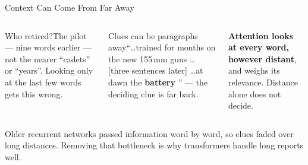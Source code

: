 \documentclass[aspectratio=169,10pt]{beamer}
\begin{document}
\begin{frame}{Context Can Come From Far Away}
\centering
{}
\vspace{2pt}
\raggedright
\begin{columns}[T]
\begin{cbox}{Who retired?}\scriptsize The pilot --- nine words earlier --- not the nearer ``cadets'' or ``years''. Looking only at the last few words gets this wrong.\end{cbox}
\begin{cbox}{Clues can be paragraphs away}\scriptsize ``\dots trained for months on the new 155\,mm guns \dots [three sentences later] \dots at dawn the \textbf{battery} \underline{\hspace{0.5cm}}'' --- the deciding clue is far back.\end{cbox}
\begin{rbox}\scriptsize\textbf{Attention looks at every word, however distant}, and weighs its relevance. Distance alone does not decide.\end{rbox}
\end{columns}
\begin{ibox}\scriptsize Older recurrent networks passed information word by word, so clues faded over long distances. Removing that bottleneck is why transformers handle long reports well.\end{ibox}
\end{frame}
\end{document}
